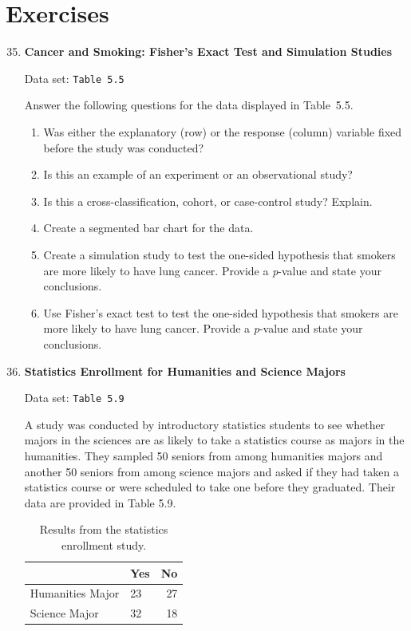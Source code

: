 \documentclass[
]{report}
\begin{document}
\hypertarget{exercises-4}{%
\section{Exercises}\label{exercises-4}}

\begin{enumerate}
  \setcounter{enumi}{34}

  \item \textbf{Cancer and Smoking: Fisher’s Exact Test and Simulation Studies}    

  Data set: \texttt{Table 5.5}    

  Answer the following questions for the data displayed in Table 5.5.  
  \begin{enumerate}
    \item Was either the explanatory (row) or the response (column) variable fixed before the study was conducted?
    \item Is this an example of an experiment or an observational study?
    \item Is this a cross-classification, cohort, or case-control study? Explain.
    \item Create a segmented bar chart for the data.
    \item Create a simulation study to test the one-sided hypothesis that smokers are more likely to have lung cancer. Provide a \textit{p}-value and state your conclusions.
    \item Use Fisher’s exact test to test the one-sided hypothesis that smokers are more likely to have lung cancer. Provide a \textit{p}-value and state your conclusions.
  \end{enumerate}

  \item \textbf{Statistics Enrollment for Humanities and Science Majors}    

  Data set: \texttt{Table 5.9}  

  A study was conducted by introductory statistics students to see whether majors in the sciences are as likely to take a statistics course as majors in the humanities. They sampled 50 seniors from among humanities majors and another 50 seniors from among science majors and asked if they had taken a statistics course or were scheduled to take one before they graduated. Their data are provided in Table 5.9.  
  
\begin{table}[!h]
\centering
\caption{\label{tab:tab9}Results from the statistics enrollment study.}
\centering
\begin{tabular}[t]{llr}
\toprule
  & Yes & No\\
\midrule
Humanities Major & 23 & 27\\
Science Major & 32 & 18\\
\bottomrule
\end{tabular}
\end{table}


\end{enumerate}
\end{document}
